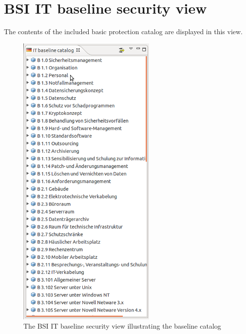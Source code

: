 \documentclass[a4paper,10pt]{book}
\begin{document}
\section{BSI IT baseline security view}
The contents of the included basic protection catalog are displayed in this view.
\newline
\begin{figure}[htb!]
  \centering
  \includegraphics[scale=.65]{Screenshot/IT-Grundschutz-View-en.png}
  \caption{\label{The BSI IT baseline security view illustrating the baseline catalog} The BSI IT baseline security view illustrating the baseline catalog}
\end{figure}
\end{document}
